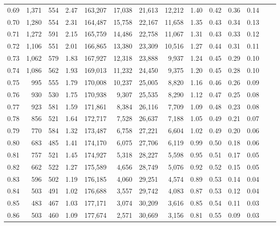 \begin{tabular}{rrrrrrrrrrrrrr}
0.69 &  1,371 &  554 &    2.47 &  163,207 &   17,038 &  21,613 &  12,212 &  1.40 &  0.42 &  0.36 &      0.14 \\
0.70 &  1,280 &  554 &    2.31 &  164,487 &   15,758 &  22,167 &  11,658 &  1.35 &  0.43 &  0.34 &      0.13 \\
0.71 &  1,272 &  591 &    2.15 &  165,759 &   14,486 &  22,758 &  11,067 &  1.31 &  0.43 &  0.33 &      0.12 \\
0.72 &  1,106 &  551 &    2.01 &  166,865 &   13,380 &  23,309 &  10,516 &  1.27 &  0.44 &  0.31 &      0.11 \\
0.73 &  1,062 &  579 &    1.83 &  167,927 &   12,318 &  23,888 &   9,937 &  1.24 &  0.45 &  0.29 &      0.10 \\
0.74 &  1,086 &  562 &    1.93 &  169,013 &   11,232 &  24,450 &   9,375 &  1.20 &  0.45 &  0.28 &      0.10 \\
0.75 &    995 &  555 &    1.79 &  170,008 &   10,237 &  25,005 &   8,820 &  1.16 &  0.46 &  0.26 &      0.09 \\
0.76 &    930 &  530 &    1.75 &  170,938 &    9,307 &  25,535 &   8,290 &  1.12 &  0.47 &  0.25 &      0.08 \\
0.77 &    923 &  581 &    1.59 &  171,861 &    8,384 &  26,116 &   7,709 &  1.09 &  0.48 &  0.23 &      0.08 \\
0.78 &    856 &  521 &    1.64 &  172,717 &    7,528 &  26,637 &   7,188 &  1.05 &  0.49 &  0.21 &      0.07 \\
0.79 &    770 &  584 &    1.32 &  173,487 &    6,758 &  27,221 &   6,604 &  1.02 &  0.49 &  0.20 &      0.06 \\
0.80 &    683 &  485 &    1.41 &  174,170 &    6,075 &  27,706 &   6,119 &  0.99 &  0.50 &  0.18 &      0.06 \\
0.81 &    757 &  521 &    1.45 &  174,927 &    5,318 &  28,227 &   5,598 &  0.95 &  0.51 &  0.17 &      0.05 \\
0.82 &    662 &  522 &    1.27 &  175,589 &    4,656 &  28,749 &   5,076 &  0.92 &  0.52 &  0.15 &      0.05 \\
0.83 &    596 &  502 &    1.19 &  176,185 &    4,060 &  29,251 &   4,574 &  0.89 &  0.53 &  0.14 &      0.04 \\
0.84 &    503 &  491 &    1.02 &  176,688 &    3,557 &  29,742 &   4,083 &  0.87 &  0.53 &  0.12 &      0.04 \\
0.85 &    483 &  467 &    1.03 &  177,171 &    3,074 &  30,209 &   3,616 &  0.85 &  0.54 &  0.11 &      0.03 \\
0.86 &    503 &  460 &    1.09 &  177,674 &    2,571 &  30,669 &   3,156 &  0.81 &  0.55 &  0.09 &      0.03 \\

\end{tabular}

